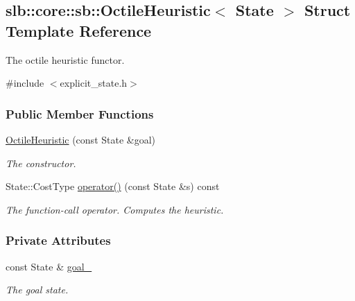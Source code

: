 \hypertarget{structslb_1_1core_1_1sb_1_1OctileHeuristic}{}\subsection{slb\+:\+:core\+:\+:sb\+:\+:Octile\+Heuristic$<$ State $>$ Struct Template Reference}
\label{structslb_1_1core_1_1sb_1_1OctileHeuristic}


The octile heuristic functor.  




{\ttfamily \#include $<$explicit\+\_\+state.\+h$>$}

\subsubsection*{Public Member Functions}
\begin{DoxyCompactItemize}
\item 
\hyperlink{structslb_1_1core_1_1sb_1_1OctileHeuristic_a786355e910f4db3dced90d844ce6bd74}{Octile\+Heuristic} (const State \&goal)
\begin{DoxyCompactList}\small\item\em The constructor. \end{DoxyCompactList}\item 
State\+::\+Cost\+Type \hyperlink{structslb_1_1core_1_1sb_1_1OctileHeuristic_af4d6fabbfcd826b2befa3b8ec7e20982}{operator()} (const State \&s) const 
\begin{DoxyCompactList}\small\item\em The function-\/call operator. Computes the heuristic. \end{DoxyCompactList}\end{DoxyCompactItemize}
\subsubsection*{Private Attributes}
\begin{DoxyCompactItemize}
\item 
const State \& \hyperlink{structslb_1_1core_1_1sb_1_1OctileHeuristic_a69a13cc8860ea43adf42f5df86b50f8a}{goal\+\_\+}\hypertarget{structslb_1_1core_1_1sb_1_1OctileHeuristic_a69a13cc8860ea43adf42f5df86b50f8a}{}\label{structslb_1_1core_1_1sb_1_1OctileHeuristic_a69a13cc8860ea43adf42f5df86b50f8a}

\begin{DoxyCompactList}\small\item\em The goal state. \end{DoxyCompactList}\end{DoxyCompactItemize}


